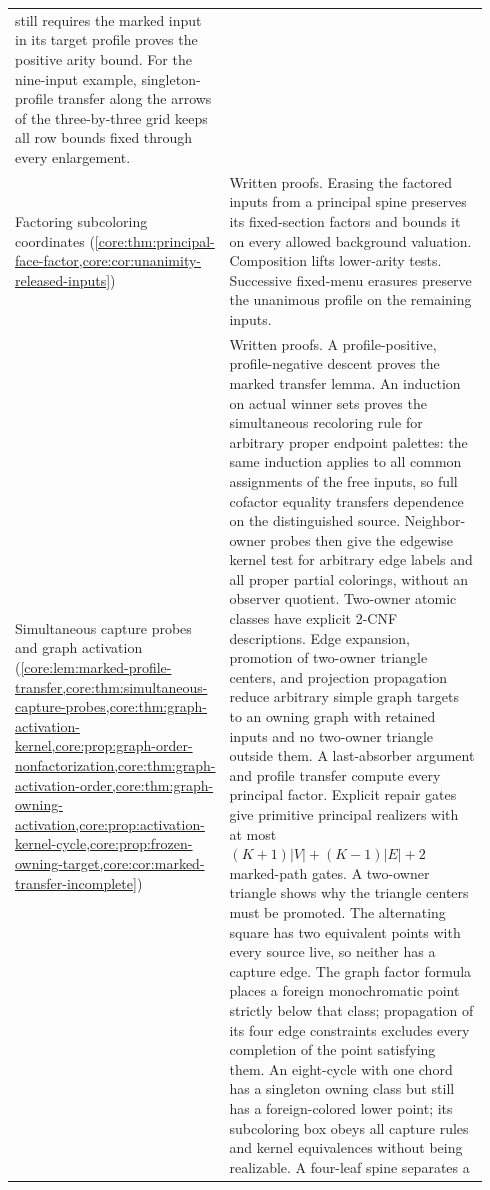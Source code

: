 {\begin{longtable}{>{\raggedright\arraybackslash}p{0.34\linewidth}>{\raggedright\arraybackslash}p{0.60\linewidth}}
still requires the marked input in its target profile proves the
positive arity bound. For the nine-input example, singleton-profile
transfer along the arrows of the three-by-three grid keeps all row
bounds fixed through every enlargement.\\
Factoring subcoloring coordinates
(\cref{core:thm:principal-face-factor,core:cor:unanimity-released-inputs})
 & Written proofs. Erasing the factored inputs from a principal
spine preserves its fixed-section factors and bounds it on every
allowed background valuation. Composition lifts lower-arity tests.
Successive fixed-menu erasures preserve the unanimous profile on
the remaining inputs.\\
Simultaneous capture probes and graph activation
(\cref{core:lem:marked-profile-transfer,core:thm:simultaneous-capture-probes,core:thm:graph-activation-kernel,core:prop:graph-order-nonfactorization,core:thm:graph-activation-order,core:thm:graph-owning-activation,core:prop:activation-kernel-cycle,core:prop:frozen-owning-target,core:cor:marked-transfer-incomplete})
 & Written proofs. A profile-positive, profile-negative descent proves
the marked transfer lemma. An induction on actual winner sets proves
the simultaneous recoloring rule for arbitrary proper endpoint palettes:
the same induction applies to all common assignments of the free inputs,
so full cofactor equality transfers dependence on the distinguished
source. Neighbor-owner probes then give the edgewise kernel test for arbitrary
edge labels and all proper partial colorings, without an observer
quotient. Two-owner atomic classes have explicit 2-CNF descriptions.
Edge expansion, promotion of two-owner triangle centers, and projection
propagation reduce arbitrary simple graph targets to an owning graph
with retained inputs and no two-owner triangle outside them.
A last-absorber argument and profile transfer compute every principal
factor. Explicit repair gates give primitive principal realizers with
at most $(K+1)|V|+(K-1)|E|+2$ marked-path gates. A two-owner triangle
shows why the triangle centers must be promoted.
The alternating square has two equivalent points with every source
live, so neither has a capture edge. The graph factor formula
places a foreign monochromatic point strictly below that
class; propagation of its four edge constraints excludes every
completion of the point satisfying them. An eight-cycle with one chord
has a singleton owning class but still has a foreign-colored lower point;
its subcoloring box obeys all capture rules and kernel equivalences
without being realizable. A four-leaf spine separates a

\end{longtable}}
